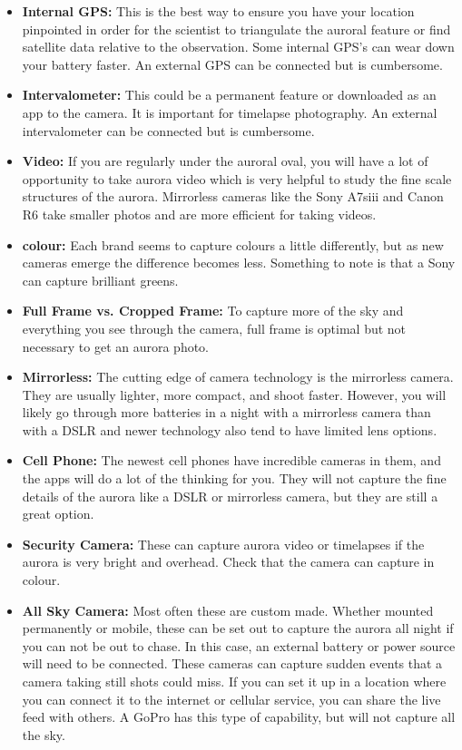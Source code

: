 \documentclass{article}
\begin{document}
\begin{itemize}
\item \textbf{Internal GPS:} This is the best way to ensure you have your location pinpointed in order for the scientist to triangulate the auroral feature or find satellite data relative to the observation. Some internal GPS's can wear down your battery faster.  An external GPS can be connected but is cumbersome. 

\item \textbf{Intervalometer:} This could be a permanent feature or downloaded as an app to the camera. It is important for timelapse photography. An external intervalometer can be connected but is cumbersome.

\item \textbf{Video:} If you are regularly under the auroral oval, you will have a lot of opportunity to take aurora video which is very helpful to study the fine scale structures of the aurora. Mirrorless cameras like the Sony A7siii and Canon R6 take smaller photos and are more efficient for taking videos.

\item \textbf{colour:} Each brand seems to capture colours a little differently, but as new cameras emerge the difference becomes less. Something to note is that a Sony can capture brilliant greens. 

\item \textbf{Full Frame vs. Cropped Frame:} To capture more of the sky and everything you see through the camera, full frame is optimal but not necessary to get an aurora photo.

\item \textbf{Mirrorless:} The cutting edge of camera technology is the mirrorless camera. They are usually lighter, more compact, and shoot faster. However, you will likely go through more batteries in a night with a mirrorless camera than with a DSLR and newer technology also tend to have limited lens options.

\item \textbf{Cell Phone:} The newest cell phones have incredible cameras in them, and the apps will do a lot of the thinking for you. They will not capture the fine details of the aurora like a DSLR or mirrorless camera, but they are still a great option.

\item \textbf{Security Camera:} These can capture aurora video or timelapses if the aurora is very bright and overhead. Check that the camera can capture in colour.

\item \textbf{All Sky Camera:} Most often these are custom made. Whether mounted permanently or mobile, these can be set out to capture the aurora all night if you can not be out to chase. In this case, an external battery or power source will need to be connected. These cameras can capture sudden events that a camera taking still shots could miss. If you can set it up in a location where you can connect it to the internet or cellular service, you can share the live feed with others. A GoPro has this type of capability, but will not capture all the sky.

\end{itemize}
\end{document}
